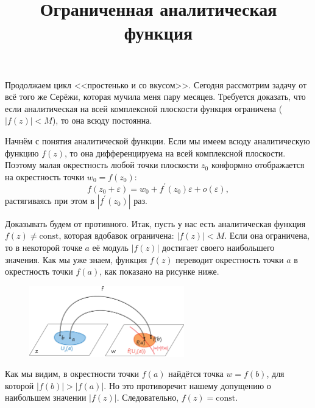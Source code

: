 

\title{Ограниченная аналитическая функция}


\maketitle

Продолжаем цикл <<простенько и со вкусом>>. Сегодня рассмотрим задачу от всё того же Серёжи, которая мучила меня пару месяцев. Требуется доказать, что если аналитическая на всей комплексной плоскости функция ограничена (\(|f(z)| < M\)), то она всюду постоянна.

Начнём с понятия аналитической функции. Если мы имеем всюду аналитическую функцию \( f(z) \), то она дифференцируема на всей комплексной плоскости. Поэтому малая окрестность любой точки плоскости \( z_0 \) конформно отображается на окрестность точки \( w_0 = f(z_0) \):
\[
    f(z_0 + \varepsilon) = w_0 + f^\prime(z_0)\varepsilon + o(\varepsilon),
\]
растягиваясь при этом в \( |f^\prime(z_0)| \) раз.

Доказывать будем от противного. Итак, пусть у нас есть аналитическая функция \( f(z) \ne \mathrm{const} \), которая вдобавок ограничена: \( |f(z)| < M \). Если она ограничена, то в некоторой точке \( a \) её модуль \(|f(z)|\) достигает своего наибольшего значения. Как мы уже знаем, функция \( f(z) \) переводит окрестность точки \( a \) в окрестность точки \( f(a) \), как показано на рисунке ниже.

\begin{figure}[h]
    \center
    \includegraphics[width=0.6\textwidth]{2016-05-27-analytic-function.png}
\end{figure}

Как мы видим, в окрестности точки \( f(a) \) найдётся точка \( w = f(b) \), для которой \( |f(b)| > |f(a)| \). Но это противоречит нашему допущению о наибольшем значении \( |f(z)| \). Следовательно, \( f(z) = \mathrm{const} \).
